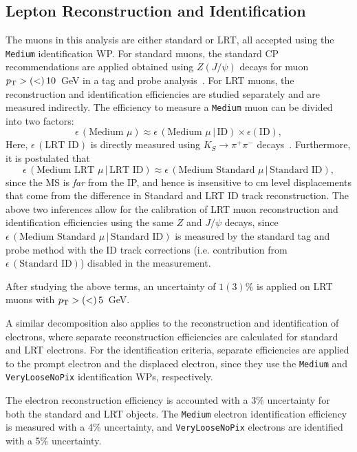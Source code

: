 \subsection*{Lepton Reconstruction and Identification}
The muons in this analysis are either standard or LRT, all accepted using the \texttt{Medium} identification WP. For standard muons, the standard CP recommendations are applied obtained using $Z(J/\psi)$ decays for muon $p_\mathrm{T} >(<)\,10$~GeV in a tag and probe analysis~\cite{MUON-2018-03}. 
For LRT muons, the reconstruction and identification efficiencies are studied separately and are measured indirectly. The efficiency to measure a \texttt{Medium} muon can be divided into two factors:
\begin{equation}
    \epsilon\, (\text{Medium }\mu) \approx \epsilon\, (\text{Medium }\mu \,|\,\mathrm{ID}) \times \epsilon (\mathrm{ID}),
\end{equation}
Here, $\epsilon\, (\text{LRT ID})$ is directly measured using $K_S\to\pi^+\pi^-$ decays~\cite{IDTR-2021-03}. Furthermore, it is postulated that
\begin{equation}
    \epsilon\, (\text{Medium LRT }\mu \,|\,\text{LRT ID})\approx\epsilon\, (\text{Medium Standard }\mu \,|\,\text{Standard ID}),
\end{equation}
since the MS is \textit{far} from the IP, and hence is insensitive to cm level displacements that come from the difference in Standard and LRT ID track reconstruction. The above two inferences allow for the calibration of LRT muon reconstruction and identification efficiencies using the same $Z$ and $J/\psi$ decays, since $\epsilon\, (\text{Medium Standard }\mu \,|\,\text{Standard ID})$ is measured by the standard tag and probe method with the ID track corrections (i.e. contribution from $\epsilon\, (\text{Standard ID})$) disabled in the measurement.

After studying the above terms, an uncertainty of $1(3)\%$ is applied on LRT muons with $p_\mathrm{T} >(<)\,5$~GeV.

A similar decomposition also applies to the reconstruction and identification of electrons, where separate reconstruction efficiencies are calculated for standard and LRT electrons. For the identification criteria, separate efficiencies are applied to the prompt electron and the displaced electron, since they use the \texttt{Medium} and \texttt{VeryLooseNoPix} identification WPs, respectively.

The electron reconstruction efficiency is accounted with a 3\% uncertainty for both the standard and LRT objects. The \texttt{Medium} electron identification efficiency is measured with a 4\% uncertainty, and \texttt{VeryLooseNoPix} electrons are identified with a 5\% uncertainty.

